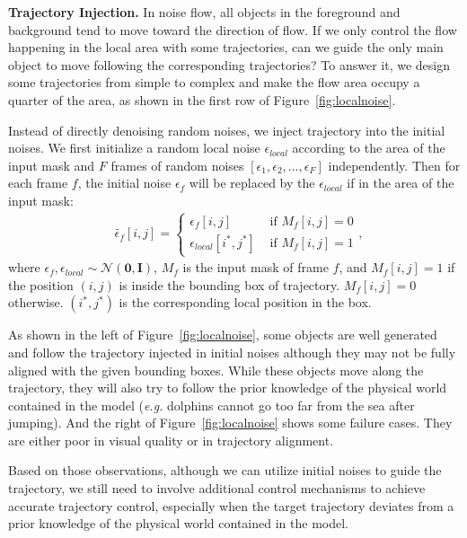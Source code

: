\noindent\textbf{Trajectory Injection.} In noise flow, all objects in the foreground and background tend to move toward the direction of flow. If we only control the flow happening in the local area with some trajectories, can we guide the only main object to move following the corresponding trajectories? To answer it, we design some trajectories from simple to complex and make the flow area occupy a quarter of the area, as shown in the first row of Figure~\ref{fig:localnoise}.

Instead of directly denoising random noises, we inject trajectory into the initial noises. We first initialize a random local noise $\epsilon_{local}$ according to the area of the input mask and $F$ frames of random noises $[\epsilon_1, \epsilon_2, ..., \epsilon_{F}]$ independently. Then for each frame $f$, the initial noise $\epsilon_{f}$ will be replaced by the $\epsilon_{local}$ if in the area of the input mask:
%
\begin{equation}
\begin{aligned}
& \tilde{\epsilon_{f}}[i, j] = \begin{cases} \epsilon_{f}[i, j] & \text { if } M_f[i, j]=0 \\
\epsilon_{local}[i^*, j^*] & \text { if } M_f[i, j]=1\end{cases},
\end{aligned}
\label{eq:noisetraj}
\end{equation}
%
where $\epsilon_{f}, \epsilon_{local} \sim \mathcal{N}\left(\mathbf{0}, \mathbf{I}\right)$, $M_f$ is the input mask of frame $f$, and $M_f[i, j]=1$ if the position $(i,j)$ is inside the bounding box of trajectory. $M_f[i, j]=0$ otherwise. $(i^*, j^*)$ is the corresponding local position in the box.



As shown in the left of Figure~\ref{fig:localnoise}, some objects are well generated and follow the trajectory injected in initial noises although they may not be fully aligned with the given bounding boxes. While these objects move along the trajectory, they will also try to follow the prior knowledge of the physical world contained in the model (\textit{e.g.} dolphins cannot go too far from the sea after jumping). And the right of Figure~\ref{fig:localnoise} shows some failure cases. They are either poor in visual quality or in trajectory alignment.

Based on those observations, although we can utilize initial noises to guide the trajectory, we still need to involve additional control mechanisms to achieve accurate trajectory control, especially when the target trajectory deviates from a prior knowledge of the physical world contained in the model.



